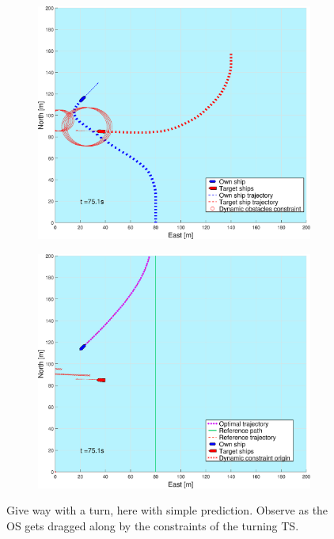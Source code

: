 \begin{figure}[ht!]
\begin{subfigure}[b]{0.494\textwidth}
        \subcaption{}
    \end{subfigure}
    \hfill
    \\
    \begin{subfigure}[b]{0.494\textwidth}
        \centering
        \includegraphics[width=\textwidth]{Images/Figures/sving_GW/_Simple_1fig1_time=75}
        \subcaption{}
    \end{subfigure}
    \hfill
    \begin{subfigure}[b]{0.494\textwidth}
        \centering
        \includegraphics[width=\textwidth]{Images/Figures/sving_GW/_Simple_1fig999_time=75}
        \subcaption{}
    \end{subfigure}
    \hfill
    \caption{Give way with a turn, here with simple prediction. Observe as the OS gets dragged along by the constraints of the turning TS.}
    \label{FIG: turn GW simple pred}
\end{figure}%
